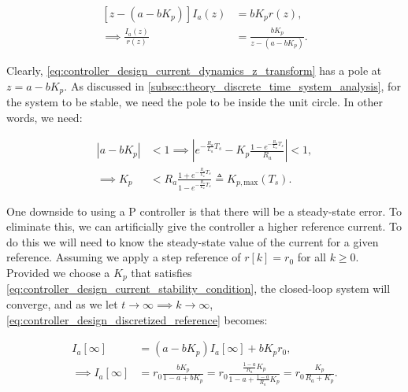 \begin{equation}
    \label{eq:controller_design_current_dynamics_z_transform}
    \begin{aligned}
        \left[z - (a - b K_p)\right] I_a(z) &= b K_p r(z),\\
        \implies \frac{I_a(z)}{r(z)} &= \frac{b K_p}{z - (a - b K_p)}.
    \end{aligned}
\end{equation}

Clearly, \cref{eq:controller_design_current_dynamics_z_transform} has a pole at $z = a - b K_p$. As discussed in \cref{subsec:theory_discrete_time_system_analysis}, for the system to be stable, we need the pole to be inside the unit circle. In other words, we need:

\begin{equation}
    \label{eq:controller_design_current_stability_condition}
    \begin{aligned}
        |a - b K_p| &< 1 \implies \left|e^{-\frac{R_a}{L_a} T_s} - K_p \frac{1 - e^{-\frac{R_a}{L_a} T_s}}{R_a}\right| < 1,\\
        \implies K_p &< R_a \frac{1 + e^{-\frac{R_a}{L_a} T_s}}{1 - e^{-\frac{R_a}{L_a} T_s}} \triangleq K_{p,\text{max}}(T_s).
    \end{aligned}
\end{equation}

One downside to using a P controller is that there will be a steady-state error. To eliminate this, we can artificially give the controller a higher reference current. To do this we will need to know the steady-state value of the current for a given reference. Assuming we apply a step reference of $r[k] = r_0$ for all $k \geq 0$. Provided we choose a $K_p$ that satisfies \cref{eq:controller_design_current_stability_condition}, the closed-loop system will converge, and as we let $t \to \infty \implies k \to \infty$, \cref{eq:controller_design_discretized_reference} becomes:

\begin{equation}
    \label{eq:controller_design_current_steady_state}
    \begin{aligned}
        I_a[\infty] &= (a - b K_p) I_a[\infty] + b K_p r_0,\\
        \implies I_a[\infty] &= r_0 \frac{b K_p}{1 - a + b K_p} = r_0 \frac{\frac{1 - a}{R_a} K_p}{1 - a + \frac{1 - a}{R_a} K_p} = r_0 \frac{K_p}{R_a + K_p}.
    \end{aligned}
\end{equation}


